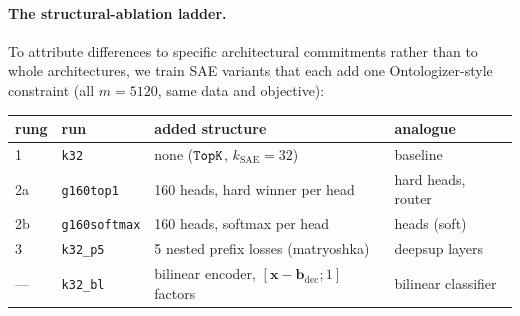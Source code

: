 \paragraph{The structural-ablation ladder.}
To attribute differences to specific architectural commitments rather than
to whole architectures, we train SAE variants that each add one
Ontologizer-style constraint (all $m{=}5120$, same data and objective):

\begin{center}
\begin{tabular}{@{}llll@{}}
\toprule
rung & run & added structure & analogue \\
\midrule
1  & \texttt{k32} & none ($\mathop{\mathtt{TopK}}\limits$, $k_{\mathrm{SAE}}{=}32$) & baseline \\
2a & \texttt{g160top1} & 160 heads, hard winner per head & hard heads, router \\
2b & \texttt{g160softmax} & 160 heads, softmax per head & heads (soft) \\
3  & \texttt{k32\_p5} & 5 nested prefix losses (matryoshka) & deepsup layers \\
--- & \texttt{k32\_bl} & bilinear encoder, $[\mathbf{x}{-}\mathbf{b}_{\mathrm{dec}};1]$ factors & bilinear classifier \\
\bottomrule
\end{tabular}
\end{center}

